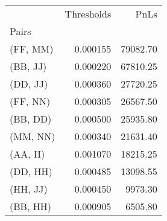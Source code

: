 \begin{tabular}{lrr}
\toprule
{} &  Thresholds &      PnLs \\
Pairs    &             &           \\
\midrule
(FF, MM) &    0.000155 &  79082.70 \\
(BB, JJ) &    0.000220 &  67810.25 \\
(DD, JJ) &    0.000360 &  27720.25 \\
(FF, NN) &    0.000305 &  26567.50 \\
(BB, DD) &    0.000500 &  25935.80 \\
(MM, NN) &    0.000340 &  21631.40 \\
(AA, II) &    0.001070 &  18215.25 \\
(DD, HH) &    0.000485 &  13098.55 \\
(HH, JJ) &    0.000450 &   9973.30 \\
(BB, HH) &    0.000905 &   6505.80 \\
\bottomrule
\end{tabular}
